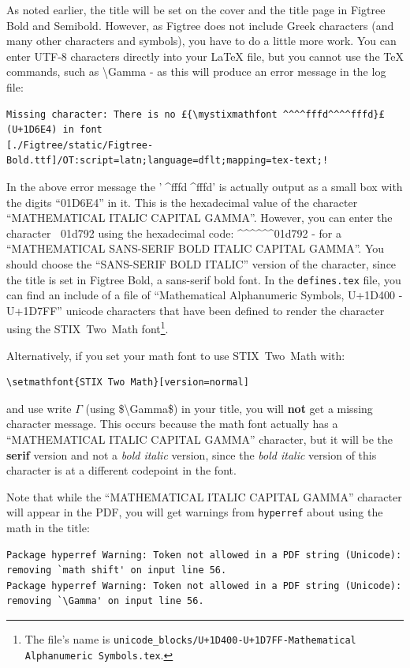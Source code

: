 \documentclass[12pt, twoside]{article}
\newcommand{\fname}[1]{\texttt{#1}}
\begin{document}
As noted earlier, the title will be set on the cover and the title page in Figtree Bold and Semibold. However, as Figtree does not include Greek characters (and many other characters and symbols), you have to do a little more work. You can enter UTF-8 characters directly into your \LaTeX{} file, but you cannot use the \TeX{} commands, such as \textbackslash Gamma - as this will produce an error message in the log file:
\begin{lstlisting}[basicstyle=\scriptsize, escapechar=£]
Missing character: There is no £{\mystixmathfont ^^^^fffd^^^^fffd}£ (U+1D6E4) in font
[./Figtree/static/Figtree-Bold.ttf]/OT:script=latn;language=dflt;mapping=tex-text;!
\end{lstlisting}

\noindent In the above error message the '{\mystixmathfont ^^^^fffd^^^^fffd}' is actually output as a small box with the digits \enquote{01D6E4} in it. This is the hexadecimal value of the character \enquote{MATHEMATICAL ITALIC CAPITAL GAMMA}. However, you can enter the character {\mystixmathfont ^^^^^^01d792} using the hexadecimal code: 
\textasciicircum\textasciicircum\textasciicircum\textasciicircum\textasciicircum \textasciicircum 01d792 - for a \enquote{MATHEMATICAL SANS-SERIF BOLD ITALIC CAPITAL GAMMA}. You should choose the \enquote{SANS-SERIF BOLD ITALIC} version of the character, since the title is set in Figtree Bold, a sans-serif bold font. In the \fname{defines.tex} file, you can find an include of a file of \enquote{Mathematical Alphanumeric Symbols, U+1D400 - U+1D7FF}  unicode characters that have been defined to render the character using the \gls{STIX}~Two~Math font\footnote{The file's name is \fname{unicode\_blocks/U+1D400-U+1D7FF-Mathematical Alphanumeric Symbols.tex}.}.


Alternatively, if you set your math font to use \gls{STIX}~Two~Math with:
\begin{Verbatim}[breaklines=true]
 \setmathfont{STIX Two Math}[version=normal]
\end{Verbatim}
\noindent and use write $\Gamma$ (using \$\textbackslash Gamma\$) in your title, you will \textbf{not} get a missing character message. This occurs because the math font actually has a \enquote{MATHEMATICAL ITALIC CAPITAL GAMMA} character, but it will be the \textbf{serif} version and not a \textit{bold italic} version, since the \textit{bold italic} version of this character is at a different codepoint in the font.

Note that while the \enquote{MATHEMATICAL ITALIC CAPITAL GAMMA} character will appear in the \gls{PDF}, you will get warnings from \texttt{hyperref} about using the math in the title:
\begin{Verbatim}[breaklines=true]
Package hyperref Warning: Token not allowed in a PDF string (Unicode): removing `math shift' on input line 56.
Package hyperref Warning: Token not allowed in a PDF string (Unicode): removing `\Gamma' on input line 56.
\end{Verbatim}
\end{document}
